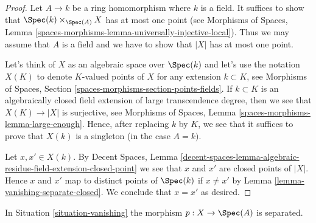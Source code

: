 \begin{proof}
Let $A \to k$ be a ring homomorphism where $k$ is a field. It suffices to
show that $\Spec(k) \times_{\Spec(A)} X$ has at most one point (see
Morphisms of Spaces, Lemma
\ref{spaces-morphisms-lemma-universally-injective-local}).
Thus we may assume that $A$ is a field and we have to show that $|X|$
has at most one point.

\medskip\noindent
Let's think of $X$ as an algebraic space over $\Spec(k)$ and let's
use the notation $X(K)$ to denote $K$-valued points of $X$
for any extension $k \subset K$, see
Morphisms of Spaces, Section \ref{spaces-morphisms-section-points-fields}.
If $k \subset K$ is an algebraically closed field extension
of large transcendence degree, then we see that $X(K) \to |X|$
is surjective, see Morphisms of Spaces, Lemma
\ref{spaces-morphisms-lemma-large-enough}. Hence, after replacing $k$
by $K$, we see that it suffices to prove that $X(k)$ is a singleton
(in the case $A = k)$.

\medskip\noindent
Let $x, x' \in X(k)$. By Decent Spaces, Lemma
\ref{decent-spaces-lemma-algebraic-residue-field-extension-closed-point}
we see that $x$ and $x'$ are closed points of $|X|$. Hence $x$ and $x'$
map to distinct points of $\Spec(k)$ if $x \not = x'$ by
Lemma \ref{lemma-vanishing-separate-closed}. We conclude that
$x = x'$ as desired.
\end{proof}

\begin{lemma}
\label{lemma-vanishing-separated}
In Situation \ref{situation-vanishing} the morphism $p : X \to \Spec(A)$ is
separated.
\end{lemma}

